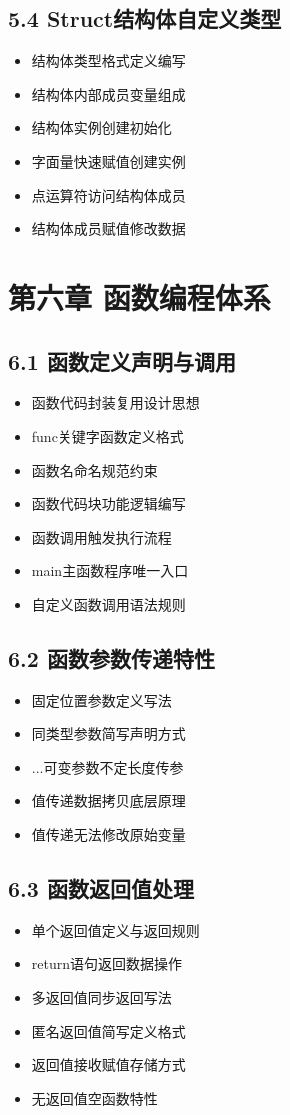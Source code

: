 \subsection{5.4 Struct结构体自定义类型}
\begin{itemize}
\item 结构体类型格式定义编写
\item 结构体内部成员变量组成
\item 结构体实例创建初始化
\item 字面量快速赋值创建实例
\item 点运算符访问结构体成员
\item 结构体成员赋值修改数据
\end{itemize}

\section{第六章 函数编程体系}
\subsection{6.1 函数定义声明与调用}
\begin{itemize}
\item 函数代码封装复用设计思想
\item func关键字函数定义格式
\item 函数名命名规范约束
\item 函数代码块功能逻辑编写
\item 函数调用触发执行流程
\item main主函数程序唯一入口
\item 自定义函数调用语法规则
\end{itemize}

\subsection{6.2 函数参数传递特性}
\begin{itemize}
\item 固定位置参数定义写法
\item 同类型参数简写声明方式
\item ...可变参数不定长度传参
\item 值传递数据拷贝底层原理
\item 值传递无法修改原始变量
\end{itemize}

\subsection{6.3 函数返回值处理}
\begin{itemize}
\item 单个返回值定义与返回规则
\item return语句返回数据操作
\item 多返回值同步返回写法
\item 匿名返回值简写定义格式
\item 返回值接收赋值存储方式
\item 无返回值空函数特性
\end{itemize}

